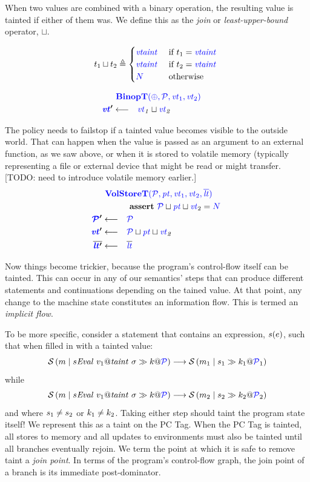 \documentclass[acmsmall,review,anonymous]{acmart}\settopmatter{printfolios=true,printccs=false,printacmref=false}
\begin{document}
When two values are combined with a binary operation, the resulting value is tainted
if either of them was. We define this as the {\em join} or {\em least-upper-bound}
operator, \(\sqcup\).

\begin{minipage}[t]{.49\textwidth}
\[t_1 \sqcup t_2 \triangleq
\begin{cases}
  \mathit{\color{blue} vtaint ~ } & \textnormal{if } t_1 = \mathit{\color{blue} vtaint ~ } \\
  \mathit{\color{blue} vtaint ~ } & \textnormal{if } t_2 = \mathit{\color{blue} vtaint ~ } \\
  {\color{blue} N} & \textnormal{otherwise} \\
\end{cases}\]
\end{minipage}
\begin{minipage}[t]{.49\textwidth}
  \[\begin{aligned}
  \truledef{\binopt}
  \settag{\vt'}{
    \vt_1 \sqcup \vt_2
  }
  \end{aligned}\]
\end{minipage}

The policy needs to failstop if a tainted value becomes visible to the outside world.
That can happen when the value is passed as an argument to an external function, as we
saw above, or when it is stored to volatile memory (typically representing a file or external
device that might be read or might transfer. [TODO: need to introduce volatile memory earlier.]
%
\[\begin{aligned}
\truledef{\volstoret}
\assert{\PCT \sqcup \pt \sqcup \vt_2 = \N}
\settag{\PCT'}{\PCT}
\settag{\vt'}{\PCT \sqcup \pt \sqcup \vt_2}
\settag{\overline{\lt'}}{\overline{\lt}}
\end{aligned}\]

Now things become trickier, because the program's control-flow itself can be tainted.
This can occur in any of our semantics' steps that can produce different statements and continuations
depending on the tained value. At that point, any change to the machine state constitutes
an information flow. This is termed an {\em implicit flow}.

To be more specific, consider a statement that contains an expression, \(s(e)\),
such that when filled in with a tainted value:
%
\[\mathcal{S}\left(m \mid s\mathit{Eval} ~ v_1@\mathit{taint} ~ \sigma \gg k @ \mathcal{\color{blue} P}\right) \longrightarrow
\mathcal{S}\left(m_1 \mid s_1 \gg k_1 @ \mathcal{\color{blue} P}_1\right)\]
%
while
%
\[\mathcal{S}\left(m \mid s\mathit{Eval} ~ v_1@\mathit{taint} ~ \sigma \gg k @ \mathcal{\color{blue} P}\right) \longrightarrow
\mathcal{S}\left(m_2 \mid s_2 \gg k_2 @ \mathcal{\color{blue} P}_2\right)\]
%
and where \(s_1 \not = s_2\) or \(k_1 \not = k_2\). Taking either step
should taint the program state itself! We represent this as a taint on the PC Tag.
When the PC Tag is tainted, all stores to memory and all updates to environments must
also be tainted until all branches eventually rejoin.
We term the point at which it is safe to remove taint a {\it join point}.
In terms of the program's control-flow graph, the
join point of a branch is its immediate post-dominator.
\end{document}
